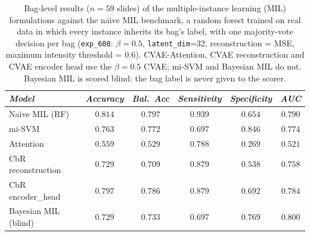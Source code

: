\begin{table}[H]
\centering
\small
\caption{Bag-level results ($n=59$ slides) of the multiple-instance learning (MIL) formulations against the na\"{\i}ve MIL benchmark, a random forest trained on real data in which every instance inherits its bag's label, with one majority-vote decision per bag (\texttt{exp\_608}: $\beta=0.5$, \texttt{latent\_dim}=32, reconstruction = MSE, maximum intensity threshold = 0.6). CVAE-Attention, CVAE reconstruction and CVAE encoder head use the $\beta=0.5$ CVAE; mi-SVM and Bayesian MIL do not. Bayesian MIL is scored blind: the bag label is never given to the scorer.}
\label{tab:mil_results}
\begin{tabular*}{\textwidth}{@{\extracolsep{\fill}}lccccc}
\toprule
\emph{Model} & \emph{Accuracy} & \emph{Bal.\ Acc} & \emph{Sensitivity} & \emph{Specificity} & \emph{AUC} \\
\midrule
Na\"{\i}ve MIL (RF) & $0.814$ & $0.797$ & $0.939$ & $0.654$ & $0.790$ \\
\midrule
mi-SVM & $0.763$ & $0.772$ & $0.697$ & $0.846$ & $0.774$ \\
Attention & $0.559$ & $0.529$ & $0.788$ & $0.269$ & $0.521$ \\
CbR reconstruction & $0.729$ & $0.709$ & $0.879$ & $0.538$ & $0.758$ \\
CbR encoder\_head & $0.797$ & $0.786$ & $0.879$ & $0.692$ & $0.784$ \\
Bayesian MIL (blind) & $0.729$ & $0.733$ & $0.697$ & $0.769$ & $0.800$ \\
\bottomrule
\end{tabular*}
\end{table}
